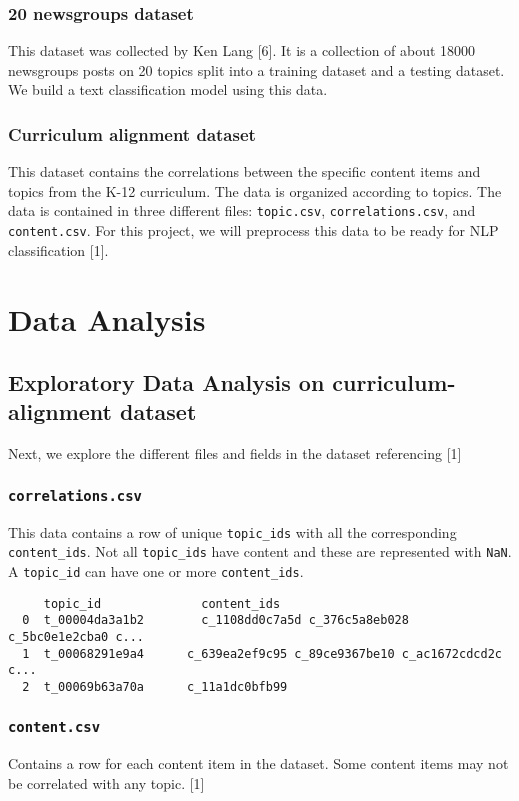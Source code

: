 \documentclass{article}
\begin{document}
\subsubsection{20 newsgroups dataset} 

This dataset was collected by Ken Lang [6]. It is a collection of about 18000 newsgroups posts on 20 topics split into a training dataset and a testing dataset. We build a text classification model using this data.

\subsubsection{Curriculum alignment dataset} 
This dataset contains the correlations between the specific content items and topics from the K-12 curriculum. The data is organized according to topics. The data is contained in three different files: \texttt{topic.csv},  \texttt{correlations.csv}, and  \texttt{content.csv}. For this project, we will preprocess this data to be ready for NLP classification [1].

\section{Data Analysis}

\subsection{Exploratory Data Analysis on curriculum-alignment dataset}
Next, we explore the different files and fields in the dataset referencing [1]

\subsubsection{\texttt{correlations.csv}}
This data contains a row of unique \texttt{topic\_ids} with all the corresponding \texttt{content\_ids}. Not all \texttt{topic\_ids} have content and these are represented with \texttt{NaN}. A \texttt{topic\_id} can have one or more \texttt{content\_ids}.
\begin{lstlisting}
     topic_id              content_ids
  0  t_00004da3a1b2        c_1108dd0c7a5d c_376c5a8eb028 c_5bc0e1e2cba0 c...
  1  t_00068291e9a4	     c_639ea2ef9c95 c_89ce9367be10 c_ac1672cdcd2c c...
  2  t_00069b63a70a	     c_11a1dc0bfb99
\end{lstlisting}

\subsubsection{\texttt{content.csv}}
Contains a row for each content item in the dataset. Some content items may not be correlated with any topic. [1]
\end{document}
